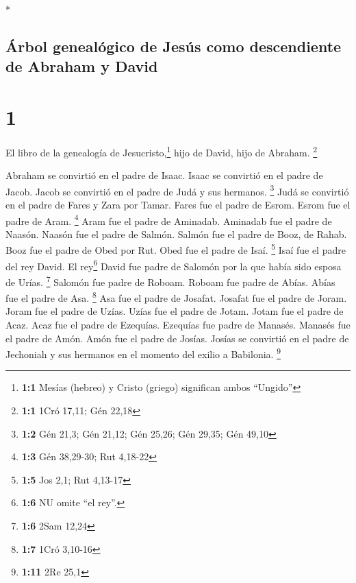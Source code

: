 \begin{paracol}{2} \switchcolumn[0]*

\hypertarget{uxe1rbol-genealuxf3gico-de-jesuxfas-como-descendiente-de-abraham-y-david}{%
\subsection{Árbol genealógico de Jesús como descendiente de Abraham y
David}\label{uxe1rbol-genealuxf3gico-de-jesuxfas-como-descendiente-de-abraham-y-david}}

\hypertarget{section}{%
\section{1}\label{section}}

 El libro de la genealogía de Jesucristo,\footnote{\textbf{1:1}
  Mesías (hebreo) y Cristo (griego) significan ambos ``Ungido''} hijo de
David, hijo de Abraham. \footnote{\textbf{1:1} 1Cró 17,11; Gén 22,18}

 Abraham se convirtió en el padre de Isaac. Isaac se
convirtió en el padre de Jacob. Jacob se convirtió en el padre de Judá y
sus hermanos. \footnote{\textbf{1:2} Gén 21,3; Gén 21,12; Gén 25,26; Gén
  29,35; Gén 49,10}  Judá se convirtió en el padre de
Fares y Zara por Tamar. Fares fue el padre de Esrom. Esrom fue el padre
de Aram. \footnote{\textbf{1:3} Gén 38,29-30; Rut 4,18-22}
 Aram fue el padre de Aminadab. Aminadab fue el padre de
Naasón. Naasón fue el padre de Salmón.  Salmón fue el
padre de Booz, de Rahab. Booz fue el padre de Obed por Rut. Obed fue el
padre de Isaí. \footnote{\textbf{1:5} Jos 2,1; Rut 4,13-17}
 Isaí fue el padre del rey David. El rey\footnote{\textbf{1:6}
  NU omite ``el rey''.} David fue padre de Salomón por la que había sido
esposa de Urías. \footnote{\textbf{1:6} 2Sam 12,24} 
Salomón fue padre de Roboam. Roboam fue padre de Abías. Abías fue el
padre de Asa. \footnote{\textbf{1:7} 1Cró 3,10-16}  Asa
fue el padre de Josafat. Josafat fue el padre de Joram. Joram fue el
padre de Uzías.  Uzías fue el padre de Jotam. Jotam fue el
padre de Acaz. Acaz fue el padre de Ezequías.  Ezequías
fue padre de Manasés. Manasés fue el padre de Amón. Amón fue el padre de
Josías.  Josías se convirtió en el padre de Jechoniah y
sus hermanos en el momento del exilio a Babilonia. \footnote{\textbf{1:11}
  2Re 25,1}


\end{paracol}
